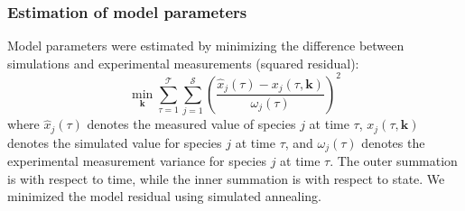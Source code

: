 \documentclass[10pt,twocolumn,twoside,final]{IEEEtran}
\begin{document}
\subsubsection*{Estimation of model parameters}
Model parameters were estimated by minimizing the difference between simulations and experimental measurements (squared residual):
\begin{equation}\label{eqn:objective-function}
	\min_{\mathbf{k}} \sum_{\tau=1}^{\mathcal{T}}\sum_{j=1}^{\mathcal{S}}\left(\frac{\hat{x}_{j}\left(\tau\right) - x_{j}\left(\tau,\mathbf{k}\right)}{\omega_{j}\left(\tau\right)}\right)^{2}
\end{equation}where $\hat{x}_{j}\left(\tau\right)$ denotes the measured value of species $j$ at time $\tau$, $x_{j}\left(\tau,\mathbf{k}\right)$ denotes the simulated
value for species $j$ at time $\tau$, and $\omega_{j}\left(\tau\right)$ denotes the experimental measurement variance for species $j$ at time $\tau$.
The outer summation is with respect to time, while the inner summation is with respect to state. We minimized the model residual using simulated annealing. 


\end{document}

